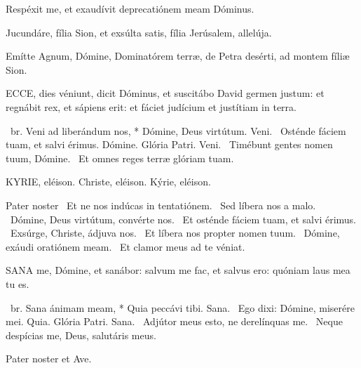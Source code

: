   Respéxit me, et exaudívit deprecatiónem meam Dóminus.


  Jucundáre, fília Sion, et exsúlta satis, fília Jerúsalem, allelúja.

  Emítte Agnum, Dómine, Dominatórem terræ, de Petra desérti, ad montem fíliæ Sion.


\lettrine[lines=2]{E}{CCE}, dies véniunt, dicit Dóminus, et suscitábo David germen justum: et regnábit rex, et sápiens erit: et fáciet judícium et justítiam in terra.

\R\ br. Veni ad liberándum nos, * Dómine, Deus virtútum. Veni. \V\ Osténde fáciem tuam, et salvi érimus. Dómine. Glória Patri. Veni. \V\ Timébunt gentes nomen tuum, Dómine. \R\ Et omnes reges terræ glóriam tuam.


KYRIE, eléison. Christe, eléison. Kýrie, eléison.

Pater noster  \V\ Et ne nos indúcas in tentatiónem. \R\ Sed líbera nos a malo. \V\ Dómine, Deus virtútum, convérte nos. \R\ Et osténde fáciem tuam, et salvi érimus. \V\ Exsúrge, Christe, ádjuva nos. \R\ Et líbera nos propter nomen tuum. \V\ Dómine, exáudi oratiónem meam. \R\ Et clamor meus ad te véniat.




\lettrine[lines=2]{S}{ANA} me, Dómine, et sanábor: salvum me fac, et salvus ero: quóniam laus mea tu es.

\R\ br. Sana ánimam meam, * Quia peccávi tibi. Sana. \V\ Ego dixi: Dómine, miserére mei. Quia. Glória Patri. Sana. \V\ Adjútor meus esto, ne derelínquas me. \R\ Neque despícias me, Deus, salutáris meus.



\sectionornament


Pater noster et Ave.

